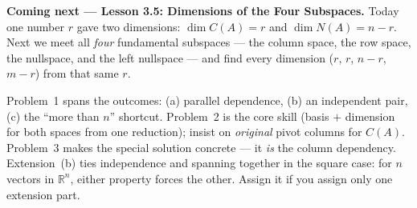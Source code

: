\documentclass[10pt]{article}
\begin{document}
\begin{spiralbox}
\textbf{Coming next --- Lesson 3.5: Dimensions of the Four Subspaces.} Today one number $r$ gave two
dimensions: $\dim C(A)=r$ and $\dim N(A)=n-r$. Next we meet all \emph{four} fundamental subspaces --- the
column space, the row space, the nullspace, and the left nullspace --- and find every dimension
($r$, $r$, $n-r$, $m-r$) from that same $r$.
\end{spiralbox}

\begin{teachernote}
Problem~1 spans the outcomes: (a) parallel dependence, (b) an independent pair, (c) the ``more than $n$''
shortcut. Problem~2 is the core skill (basis $+$ dimension for both spaces from one reduction); insist on
\emph{original} pivot columns for $C(A)$. Problem~3 makes the special solution concrete --- it \emph{is}
the column dependency. Extension~(b) ties independence and spanning together in the square case: for $n$
vectors in $\mathbb{R}^n$, either property forces the other. Assign it if you assign only one extension part.
\end{teachernote}
\end{document}
